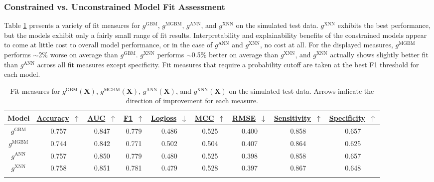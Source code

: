 \documentclass[information,article,submit,moreauthors,pdftex]{definitions/mdpi}
\begin{document}
\subsubsection{Constrained vs. Unconstrained Model Fit Assessment}\label{ssec:c_v_uc_sim}

Table \ref{tab:sim_acc} presents a variety of fit measures for $g^\text{GBM}$, $g^\text{MGBM}$, $g^\text{ANN}$, and $g^\text{XNN}$ on the simulated test data. $g^\text{XNN}$ exhibits the best performance, but the models exhibit only a fairly small range of fit results. Interpretability and explainability benefits of the constrained models appear to come at little cost to overall model performance, or in the case of $g^\text{ANN}$ and $g^\text{XNN}$, no cost at all. For the displayed measures, $g^\text{MGBM}$ performs $\sim$2\% worse on average than $g^\text{GBM}$. $g^\text{XNN}$ performs $\sim$0.5\% better on average than $g^\text{XNN}$, and $g^\text{XNN}$ actually shows slightly better fit than $g^\text{ANN}$ across all fit measures except specificity. Fit measures that require a probability cutoff are taken at the best F1 threshold for each model.

\begin{table}[H]
	\caption{Fit measures for $g^\text{GBM}(\mathbf{X})$, $g^\text{MGBM}(\mathbf{X})$, $g^\text{ANN}(\mathbf{X})$, and $g^\text{XNN}(\mathbf{X})$ on the simulated test data. Arrows indicate the direction of improvement for each measure.}
	\centering
	\begin{tabular}{ccccccccc}
		\toprule
		\textbf{Model} & 
		\href{https://scikit-learn.org/stable/modules/model_evaluation.html#accuracy-score}{\textbf{Accuracy}}~$\uparrow$ & \href{https://en.wikipedia.org/wiki/Receiver_operating_characteristic#Area_under_the_curve}{\textbf{AUC}}~$\uparrow$ & \href{https://en.wikipedia.org/wiki/F1_score}{\textbf{F1}}~$\uparrow$ & 
		\href{https://scikit-learn.org/stable/modules/model_evaluation.html#log-loss}{\textbf{Logloss}}~$\downarrow$ & \href{https://en.wikipedia.org/wiki/Matthews_correlation_coefficient}{\textbf{MCC}}~$\uparrow$ & \href{https://en.wikipedia.org/wiki/Root-mean-square_deviation}{\textbf{RMSE}}~$\downarrow$ & \href{https://en.wikipedia.org/wiki/Sensitivity_and_specificity}{\textbf{Sensitivity}}~$\uparrow$ & \href{https://en.wikipedia.org/wiki/Sensitivity_and_specificity}{\textbf{Specificity}}~$\uparrow$ \\
		\midrule
		$g^\text{GBM}$		& 0.757 	& 0.847 	& 0.779 & 0.486 & 0.525 & 0.400 & 0.858 & 0.657 \\
		$g^\text{MGBM}$	& 0.744 	& 0.842 	& 0.771 & 0.502 & 0.504 & 0.407 & 0.864 & 0.625 \\
		$g^\text{ANN}$		& 0.757	& 0.850	& 0.779 & 0.480 & 0.525 & 0.398 & 0.858 & 0.657 \\
		$g^\text{XNN}$		& 0.758	& 0.851	& 0.781 & 0.479 & 0.528 & 0.397 & 0.867 & 0.648 \\
		\bottomrule
		\label{tab:sim_acc}
	\end{tabular}
\end{table}
\end{document}
